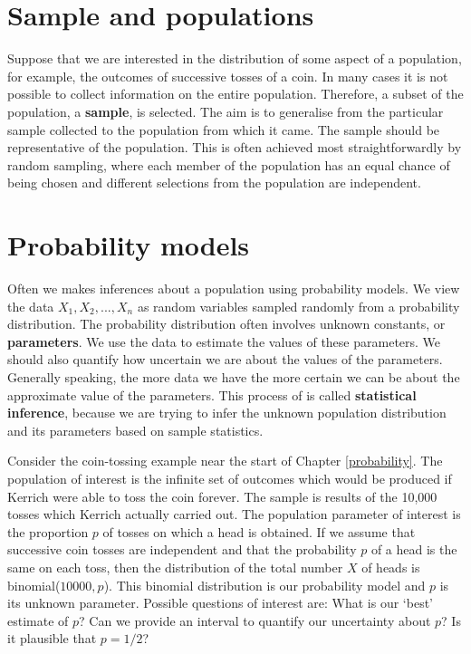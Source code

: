 \documentclass[
  british,
  11pt,
  openany, a4paper]{book}
\begin{document}
\section{Sample and populations}\label{sample-and-populations}

Suppose that we are interested in the distribution of some aspect of a population, for example, the outcomes of successive tosses of a coin. In many cases it is not possible to collect information on the entire population. Therefore, a subset of the population, a \textbf{sample}, is selected. The aim is to generalise from the particular sample collected to the population from which it came. The sample should be representative of the population. This is often achieved most straightforwardly by random sampling, where each member of the population has an equal chance of being chosen and different selections from the population are independent.

\section{Probability models}\label{probmodels}

Often we makes inferences about a population using probability models. We view the data \(X_1, X_2,...,X_n\) as random variables sampled randomly from a probability distribution. The probability distribution often involves unknown constants, or \textbf{parameters}. We use the data to estimate the values of these parameters. We should also quantify how uncertain we are about the values of the parameters. Generally speaking, the more data we have the more certain we can be about the approximate value of the parameters. This process of is called \textbf{statistical inference}, because we are trying to infer the unknown population distribution and its parameters based on sample statistics.

Consider the coin-tossing example near the start of Chapter \ref{probability}. The population of interest is the infinite set of outcomes which would be produced if Kerrich were able to toss the coin forever. The sample is results of the 10,000 tosses which Kerrich actually carried out. The population parameter of interest is the proportion \(p\) of tosses on which a head is obtained. If we assume that successive coin tosses are independent and that the probability \(p\) of a head is the same on each toss, then the distribution of the total number \(X\) of heads is binomial(\(10000, p\)). This binomial distribution is our probability model and \(p\) is its unknown parameter. Possible questions of interest are:
What is our `best' estimate of \(p\)? Can we provide an interval to quantify our uncertainty about \(p\)? Is it plausible that \(p=1/2\)?
\end{document}
